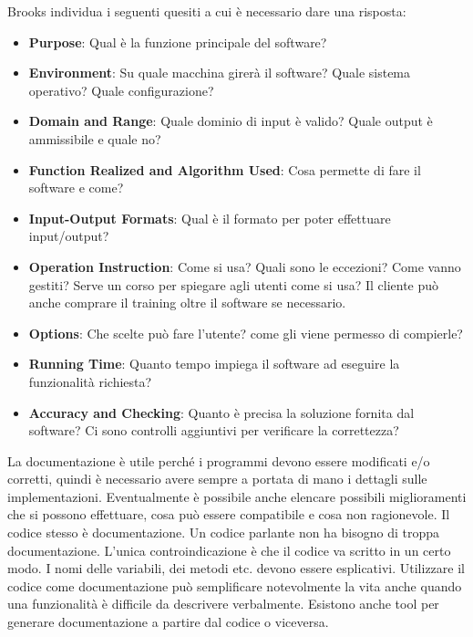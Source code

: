 Brooks individua i seguenti quesiti a cui è necessario dare una risposta:
\begin{itemize}
	\item \textbf{Purpose}: Qual è la funzione principale del software?
	\item \textbf{Environment}: Su quale macchina girerà il software? Quale sistema operativo? Quale configurazione?
	\item \textbf{Domain and Range}: Quale dominio di input è valido? Quale output è ammissibile e quale no?
	\item \textbf{Function Realized and Algorithm Used}: Cosa permette di fare il software e come?
	\item \textbf{Input-Output Formats}: Qual è il formato per poter effettuare input/output?
	\item \textbf{Operation Instruction}: Come si usa? Quali sono le eccezioni? Come vanno gestiti? Serve un corso per spiegare agli utenti come si usa? Il cliente può anche comprare il training oltre il software se necessario.
	\item \textbf{Options}: Che scelte può fare l'utente? come gli viene permesso di compierle?
	\item \textbf{Running Time}: Quanto tempo impiega il software ad eseguire la funzionalità richiesta?
	\item \textbf{Accuracy and Checking}: Quanto è precisa la soluzione fornita dal software? Ci sono controlli aggiuntivi per verificare la correttezza?
\end{itemize}
La documentazione è utile perché i programmi devono essere modificati e/o corretti, quindi è necessario avere sempre a portata di mano i dettagli sulle implementazioni.\newline
Eventualmente è possibile anche elencare possibili miglioramenti che si possono effettuare, cosa può essere compatibile e cosa non ragionevole.\newline
Il codice stesso è documentazione. Un codice parlante non ha bisogno di troppa documentazione. L'unica controindicazione è che il codice va scritto in un certo modo. I nomi delle variabili, dei metodi etc. devono essere esplicativi. Utilizzare il codice come documentazione può semplificare notevolmente la vita anche quando una funzionalità è difficile da descrivere verbalmente. Esistono anche tool per generare documentazione a partire dal codice o viceversa.

